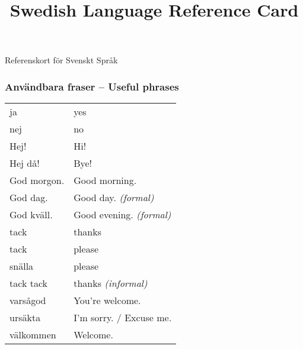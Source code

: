 \documentclass[12pt]{refcard}
\title{Swedish Language Reference Card}
\begin{document}
\centering

\maketitle
\vspace{-1ex}
Referenskort för Svenskt Språk

\subsubsection{Användbara fraser -- Useful phrases}
\vspace{-1ex}
\begin{tabular}{ll}
ja                     & yes                            \\
nej                    & no                             \\[1ex]

Hej!                   & Hi!                            \\
Hej då!                & Bye!                           \\
God morgon.            & Good morning.                  \\
God dag.               & Good day. \emph{(formal)}      \\
God kväll.             & Good evening. \emph{(formal)}  \\[1ex]

tack                   & thanks                         \\
tack                   & please                         \\
snälla                 & please                         \\
tack tack              & thanks \emph{(informal)}       \\
varsågod               & You're welcome.                \\[1ex]

ursäkta                & I'm sorry. / Excuse me.        \\[1ex]

välkommen              & Welcome.                       \\[1ex]
\end{tabular}

\pagebreak
\end{document}
